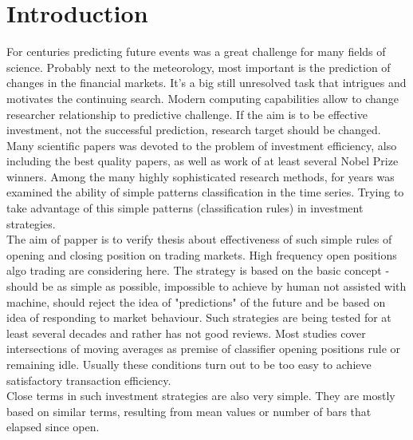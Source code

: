 \documentclass{tewiart}
\begin{document}
\section{Introduction}
\indent For centuries predicting future events was a great challenge for many fields of science. Probably next to the meteorology, most important is the prediction of changes in the financial markets. It's a big still unresolved task that intrigues and motivates the continuing search. Modern computing capabilities allow to change researcher relationship to predictive challenge. If the aim is to be effective investment, not the successful prediction, research target should be changed. Many scientific papers was devoted to the problem of investment efficiency, also including the best quality papers, as well as work of at least several Nobel Prize winners. Among the many highly sophisticated research methods, for years was examined the ability of simple patterns classification in the time series. Trying to take advantage of this simple patterns (classification rules) in investment strategies.\\
\indent The aim of papper is to verify thesis about effectiveness of such simple rules of opening and closing position on trading markets. High frequency open positions algo trading are considering here. The strategy is based on the basic concept - should be as simple as possible, impossible to achieve by human not assisted with machine, should reject the idea of "predictions" of the future and be based on idea of responding to market behaviour. Such strategies are being tested for at least several decades and rather has not good reviews. Most studies cover intersections of moving averages as premise of classifier opening positions rule or remaining idle. Usually these conditions turn out to be too easy to achieve satisfactory transaction efficiency.\\
\indent Close terms in such investment strategies are also very simple. They are mostly based on similar terms, resulting from mean values or number of bars that elapsed since open.
\end{document}
